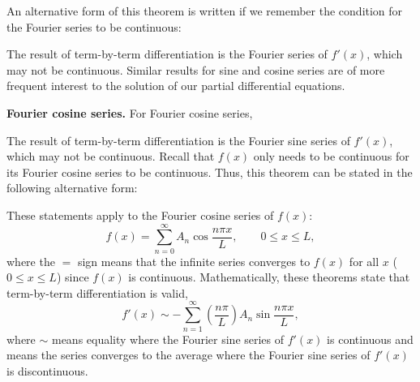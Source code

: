 An alternative form of this theorem is written if we remember the condition for the Fourier series to be continuous:

\begin{center}
\end{center}

The result of term-by-term differentiation is the Fourier series of $f'(x)$, which may not be continuous.  Similar results for sine and cosine series are of more frequent interest to the solution of our partial differential equations.

\textbf{Fourier cosine series.}  For Fourier cosine series,

\begin{center}
\end{center}

The result of term-by-term differentiation is the Fourier sine series of $f'(x)$, which may not be continuous.  Recall that $f(x)$ only needs to be continuous for its Fourier cosine series to be continuous.  Thus, this theorem can be stated in the following alternative form:

\begin{center}
\end{center}

These statements apply to the Fourier cosine series of $f(x)$:
\begin{equation}
\label{eq:cosine-series-diff}
\boxed{f(x) = \sum_{n=0}^{\infty} A_n \cos \frac{n\pi x}{L}, \qquad 0 \le x \le L,}
\end{equation}
where the $=$ sign means that the infinite series converges to $f(x)$ for all $x$ ($0 \le x \le L$) since $f(x)$ is continuous.  Mathematically, these theorems state that term-by-term differentiation is valid,
\begin{equation}
\label{eq:cosine-diff}
f'(x) \sim -\sum_{n=1}^{\infty} \left(\frac{n\pi}{L}\right) A_n \sin \frac{n\pi x}{L},
\end{equation}
where $\sim$ means equality where the Fourier sine series of $f'(x)$ is continuous and means the series converges to the average where the Fourier sine series of $f'(x)$ is discontinuous.

